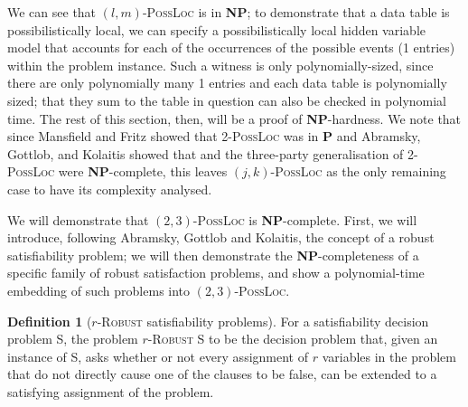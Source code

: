 \documentclass[reprint]{revtex4-1}
\theoremstyle{definition}
\newtheorem{defn}{Definition}
\begin{document}
We can see that $(l,m)$-\textsc{PossLoc} is in \textbf{NP}; to demonstrate that a data table is possibilistically local, we can specify a possibilistically local hidden variable model that accounts for each of the occurrences of the possible events (1 entries) within the problem instance. Such a witness is only polynomially-sized, since there are only polynomially many 1 entries and each data table is polynomially sized; that they sum to the table in question can also be checked in polynomial time. The rest of this section, then, will be a proof of \textbf{NP}-hardness. We note that since Mansfield and Fritz \cite{Mans2011} showed that \textsc{2-PossLoc} was in \textbf{P} and Abramsky, Gottlob, and Kolaitis showed that   and the three-party generalisation of \textsc{2-PossLoc} were \textbf{NP}-complete, this leaves $(j,k)$-\textsc{PossLoc} as the only remaining case to have its complexity analysed.

We will demonstrate that $(2,3)$-\textsc{PossLoc} is \textbf{NP}-complete. First, we will introduce, following Abramsky, Gottlob and Kolaitis, the concept of a robust satisfiability problem; we will then demonstrate the \textbf{NP}-completeness of a specific family of robust satisfaction problems, and show a polynomial-time embedding of such problems into $(2,3)$-\textsc{PossLoc}.

\begin{defn}[$r$-\textsc{Robust} satisfiability problems]	
For a satisfiability decision problem \textsc{S}, the problem $r$-\textsc{Robust S} to be the decision problem that, given an instance of \textsc{S}, asks whether or not every assignment of $r$ variables in the problem that do not directly cause one of the clauses to be false, can be extended to a satisfying assignment of the problem.
\end{defn}
\end{document}
